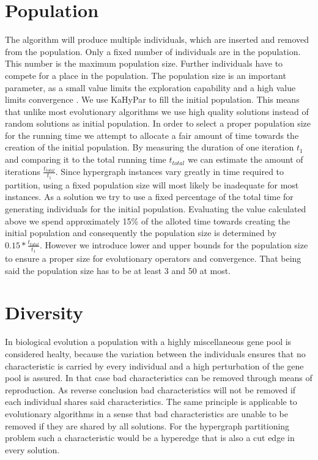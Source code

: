 \documentclass[a4paper,12pt,titlepage, BCOR7mm,headsepline]{scrbook}
\numberwithin{equation}{section}
\begin{document}
\section{Population}

The algorithm will produce multiple individuals, which are inserted and removed from the population. Only a fixed number of
individuals are in the population. This number is the maximum population size. Further individuals have to compete for a place in the population. 
The population size is an important parameter, as a small value limits the exploration capability and a high value limits convergence \cite{chen2012large}.
We use KaHyPar to fill the initial population. This means that unlike most evolutionary algorithms we use high quality solutions instead of random solutions as initial population.
In order to select a proper population size for the running time we attempt to allocate a fair amount of time towards the creation of the initial population. 
By measuring the duration of one iteration $t_1$ and comparing it to the total running time ${t_{total}}$ we can estimate the amount of iterations $\frac{t_{total}}{t_1}$. Since hypergraph instances
vary greatly in time required to partition, using a fixed population size will most likely be inadequate for most instances. As a solution we try to use a fixed percentage of the total time for generating 
individuals for the initial population. Evaluating the value calculated above we spend approximately 15\% of the alloted time towards creating the initial population and consequently the population size is determined by $0.15*\frac{t_{total}}{t_1}$.
However we introduce lower and upper bounds for the population size to ensure a proper size for evolutionary operators and convergence. That being said the population size has to be at least 3 and 50 at most.
\section{Diversity}
In biological evolution a population with a highly miscellaneous gene pool is considered healty, because the variation between the individuals ensures that no characteristic is carried by every individual and a high perturbation of the gene pool is assured. In that case bad characteristics can be removed through means of reproduction. As reverse conclusion bad characteristics will not be removed if each individual shares said characteristics. 
The same principle is applicable to evolutionary algorithms in a sense that bad characteristics are unable to be removed if they are shared by all solutions. For the hypergraph partitioning problem such a characteristic would be a hyperedge that is also a cut edge in every solution. 
\end{document}
